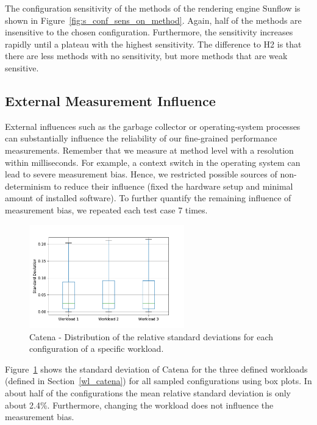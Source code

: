 The configuration sensitivity of the methods of the rendering engine Sunflow is shown in Figure~\ref{fig:s_conf_sens_on_method}. Again, half of the methods are insensitive to the chosen configuration. Furthermore, the sensitivity increases rapidly until a plateau with the highest sensitivity. The difference to H2 is that there are less methods with no sensitivity, but more methods that are weak sensitive.



\subsection{External Measurement Influence}
\label{ext_measurement_infl}

External influences such as the garbage collector or operating-system processes can substantially influence the reliability of our fine-grained performance measurements. Remember that we measure at method level with a resolution within milliseconds. For example, a context switch in the operating system can lead to severe measurement bias. Hence, we restricted possible sources of non-determinism to reduce their influence (fixed the hardware setup and minimal amount of installed software). To further quantify the remaining influence of measurement bias, we repeated each test case 7 times.

\begin{figure}[h]
  \centering
  \includegraphics[width=0.6\textwidth]{images/catena_m_infl_wl_012}
  \caption{Catena - Distribution of the relative standard deviations for each configuration of a specific workload.}
  \label{box_measure_infl_catena}
\end{figure}

Figure~\ref{box_measure_infl_catena} shows the standard deviation of Catena for the three defined workloads (defined in Section~\ref{wl_catena}) for all sampled configurations using box plots. In about half of the configurations the mean relative standard deviation is only about 2.4\%. Furthermore, changing the workload does not influence the measurement bias.

